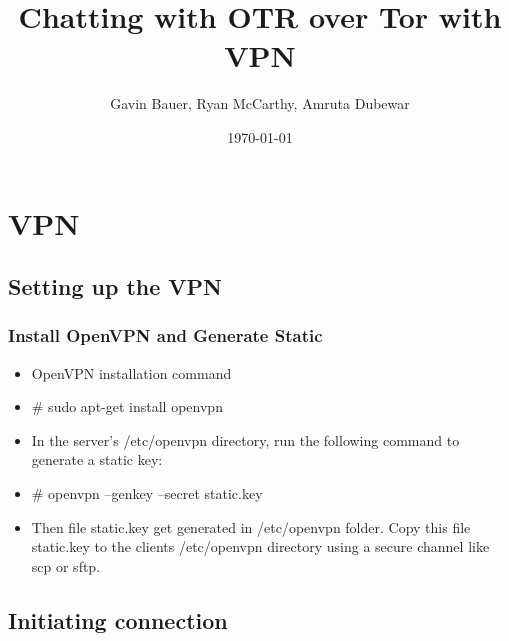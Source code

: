 \documentclass{beamer}
\title{Chatting with OTR over Tor with VPN}
\author{Gavin Bauer, Ryan McCarthy, Amruta Dubewar}
\date{\today}
\begin{document}
\begin{frame}
\maketitle
\end{frame}
\section{VPN}
\subsection{Setting up the VPN}
\begin{frame}
\frametitle{Install OpenVPN and Generate Static}
\begin{itemize}
\item OpenVPN installation command\\
\item \# sudo apt-get install openvpn\\
\item In the server's /etc/openvpn directory, run the following command to generate a static key:
\item	\# openvpn --genkey --secret static.key

\item Then file static.key get generated in /etc/openvpn folder. Copy this file static.key to the clients /etc/openvpn directory using a secure channel like scp or sftp.

\end{itemize}
\end{frame}
\subsection{Initiating connection}
\end{document}
